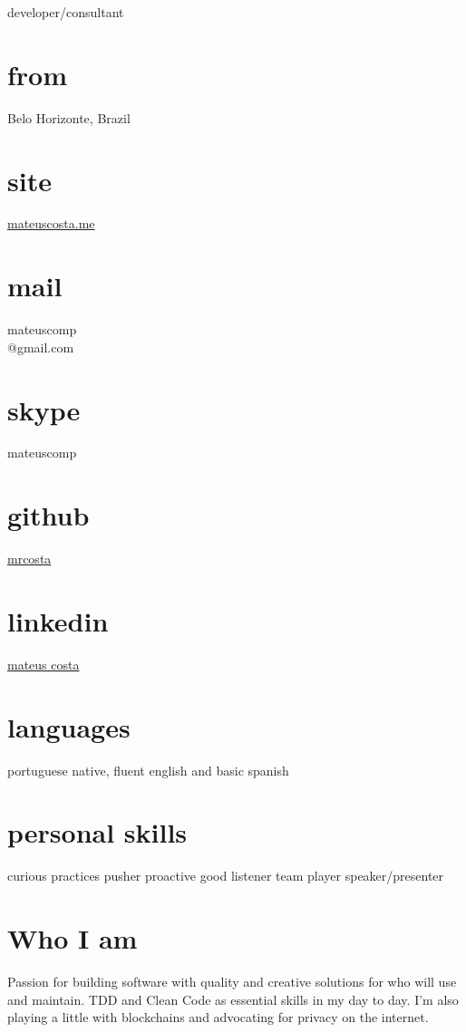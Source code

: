 \documentclass[]{friggeri-cv}
\begin{document}
       {developer/consultant}

\begin{aside}
  \section{from}
    \large Belo Horizonte, Brazil
  \section{site}
    \href{http://mateuscosta.me}{mateuscosta.me}
  \section{mail}
    mateuscomp\\@gmail.com 
  \section{skype}
    mateuscomp
  \section{github}
    \href{https://github.com/mrcosta}{mrcosta}
  \section{linkedin}
    \href{www.linkedin.com/in/mateusrodriguescosta}{mateus costa}
 \section{languages}
    portuguese native,
    fluent english and basic spanish
  \section{personal skills}
    curious
    practices pusher
    proactive
    good listener
    team player
    speaker/presenter
\end{aside}

\section{Who I am}
\begin{normalfont}
Passion for building software with quality and creative solutions for who will use and maintain. TDD and Clean Code as essential skills in my day to day. I'm also playing a little with blockchains and advocating for privacy on the internet.
\end{normalfont}
\end{document}
